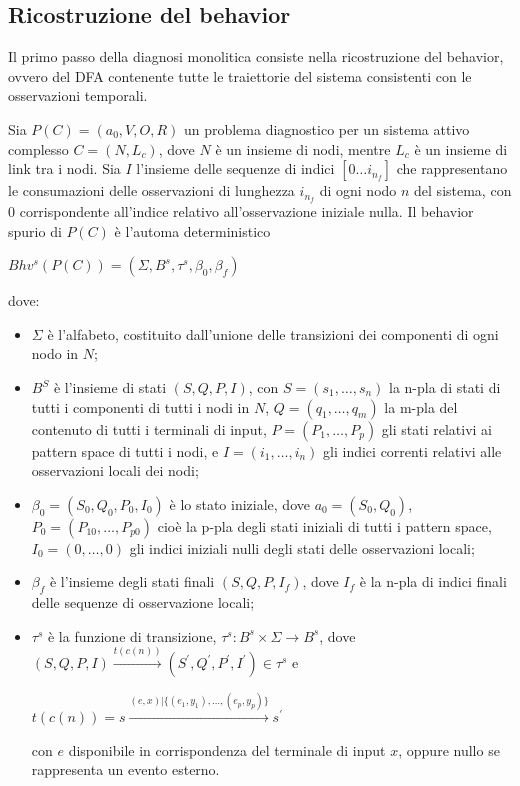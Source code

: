 \subsection{Ricostruzione del behavior}
Il primo passo della diagnosi monolitica consiste nella ricostruzione del behavior, ovvero del DFA contenente tutte le traiettorie del sistema consistenti con le osservazioni temporali.
\begin{defn}
Sia $P(C) = (a_0,V,O,R)$ un problema diagnostico per un sistema attivo complesso $C = (N,L_c)$, dove $N$ è un insieme di nodi, mentre $L_c$ è un insieme di link tra i nodi. Sia $I$ l'insieme delle sequenze di indici $[0 \ldots i_{n_f}]$ che rappresentano le consumazioni delle osservazioni di lunghezza $i_{n_f}$ di ogni nodo $n$ del sistema, con $0$ corrispondente all'indice relativo all'osservazione iniziale nulla. 
Il behavior spurio di $P(C)$ è l'automa deterministico
\begin{center}
	$Bhv^s(P(C)) = (\Sigma,B^s,\tau^s,\beta_0,\beta_f)$
\end{center}
dove:
\begin{itemize}
\item $\Sigma$ è l'alfabeto, costituito dall'unione delle transizioni dei componenti di ogni nodo in $N$;
\item $B^S$ è l'insieme di stati $(S,Q,P,I)$, con $S = (s_1,\ldots,s_n)$ la n-pla di stati di tutti i componenti di tutti i nodi in $N$, $Q = (q_1,\ldots,q_m)$ la m-pla del contenuto di tutti i terminali di input, $P = (P_1,\ldots,P_p)$ gli stati relativi ai pattern space di tutti i nodi, e $I = (i_1, \ldots, i_n)$ gli indici correnti relativi alle osservazioni locali dei nodi;
\item $\beta_0 = (S_0,Q_0,P_0,I_0)$ è lo stato iniziale, dove $a_0 = (S_0,Q_0)$, $P_0 = (P_{10},\ldots,P_{p0})$ cioè la p-pla degli stati iniziali di tutti i pattern space, $I_0 = (0,\ldots,0)$ gli indici iniziali nulli degli stati delle osservazioni locali;
\item $\beta_f$ è l'insieme degli stati finali $(S,Q,P,I_f)$, dove $I_f$ è la n-pla di indici finali delle sequenze di osservazione locali;
\item $\tau^s$ è la funzione di transizione, $\tau^s: B^s \times \Sigma \rightarrow B^s$, dove $(S,Q,P,I) \xrightarrow{t(c(n))} (S^\prime,Q^\prime,P^\prime,I^\prime) \in \tau^s$ e 
\begin{center}
	$t(c(n)) = s \xrightarrow{(e,x) | \{(e_1,y_1), \ldots, (e_p,y_p)\}} s^\prime$
\end{center}
con $e$ disponibile in corrispondenza del terminale di input $x$, oppure nullo se rappresenta un evento esterno.

\end{itemize}
\end{defn}
